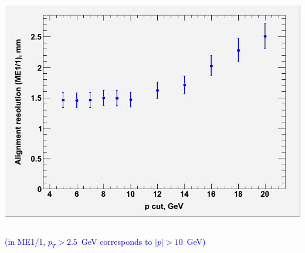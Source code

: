 \documentclass[compress]{beamer}
\begin{document}
\begin{frame}
\begin{columns}
\includegraphics[width=\linewidth]{momentum_cut_study_csc.png}
\end{columns}

\hfill \textcolor{blue}{\scriptsize (in ME1/1, $p_T > 2.5$~GeV corresponds to $|p| > 10$~GeV)}
\end{frame}
\end{document}
